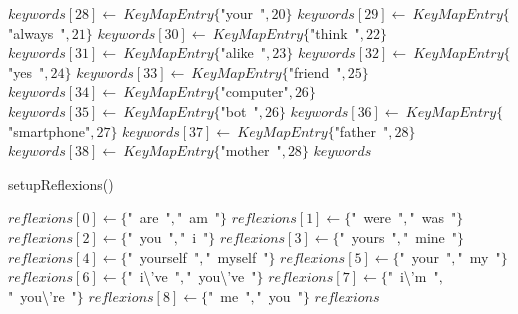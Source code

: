 \documentclass[a4paper,10pt]{article}
\begin{document}
\begin{algorithm}
\begin{algorithmic}[5]
  \STATE \(keywords[28]\gets\ KeyMapEntry\{\)"{}your\ "{}\(,20\}\)
  \STATE \(keywords[29]\gets\ KeyMapEntry\{\)"{}always\ "{}\(,21\}\)
  \STATE \(keywords[30]\gets\ KeyMapEntry\{\)"{}think\ "{}\(,22\}\)
  \STATE \(keywords[31]\gets\ KeyMapEntry\{\)"{}alike\ "{}\(,23\}\)
  \STATE \(keywords[32]\gets\ KeyMapEntry\{\)"{}yes\ "{}\(,24\}\)
  \STATE \(keywords[33]\gets\ KeyMapEntry\{\)"{}friend\ "{}\(,25\}\)
  \STATE \(keywords[34]\gets\ KeyMapEntry\{\)"{}computer"{}\(,26\}\)
  \STATE \(keywords[35]\gets\ KeyMapEntry\{\)"{}bot\ "{}\(,26\}\)
  \STATE \(keywords[36]\gets\ KeyMapEntry\{\)"{}smartphone"{}\(,27\}\)
  \STATE \(keywords[37]\gets\ KeyMapEntry\{\)"{}father\ "{}\(,28\}\)
  \STATE \(keywords[38]\gets\ KeyMapEntry\{\)"{}mother\ "{}\(,28\}\)
  \RETURN\(keywords\)

\end{algorithmic}
\end{algorithm}


\begin{algorithm}
\caption{setupReflexions()}
\begin{algorithmic}[5]

\STATE {}
\STATE {}
\STATE {}
  \STATE \(reflexions[0]\gets\{\)"{}\ are\ "{}\(,\)"{}\ am\ "{}\(\}\)
  \STATE \(reflexions[1]\gets\{\)"{}\ were\ "{}\(,\)"{}\ was\ "{}\(\}\)
  \STATE \(reflexions[2]\gets\{\)"{}\ you\ "{}\(,\)"{}\ i\ "{}\(\}\)
  \STATE \(reflexions[3]\gets\{\)"{}\ yours\ "{}\(,\)"{}\ mine\ "{}\(\}\)
  \STATE \(reflexions[4]\gets\{\)"{}\ yourself\ "{}\(,\)"{}\ myself\ "{}\(\}\)
  \STATE \(reflexions[5]\gets\{\)"{}\ your\ "{}\(,\)"{}\ my\ "{}\(\}\)
  \STATE \(reflexions[6]\gets\{\)"{}\ i\textbackslash{}'{}ve\ "{}\(,\)"{}\ you\textbackslash{}'{}ve\ "{}\(\}\)
  \STATE \(reflexions[7]\gets\{\)"{}\ i\textbackslash{}'{}m\ "{}\(,\)"{}\ you\textbackslash{}'{}re\ "{}\(\}\)
  \STATE \(reflexions[8]\gets\{\)"{}\ me\ "{}\(,\)"{}\ \textbar{}you\ "{}\(\}\)
  \RETURN\(reflexions\)

\end{algorithmic}
\end{algorithm}
\end{document}
